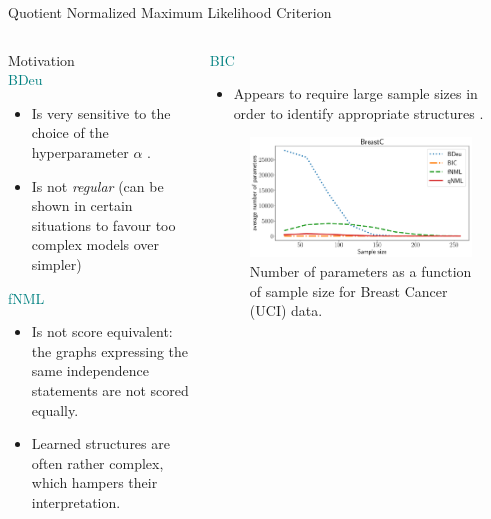 \documentclass[final]{beamer}
\newcommand{\heading}[1]{\alert{\large #1}\\}
\theoremstyle{plain}
\begin{document}
\begin{frame}{}
\begin{block}{Quotient Normalized Maximum Likelihood Criterion}
\begin{columns}[T]
   \begin{column}{0.18\textwidth} %
   \heading{Motivation}
   \vspace*{12pt}
   	\textcolor{teal}{BDeu}
	\begin{itemize}	    
    \item Is very sensitive to the choice of the hyperparameter $\alpha$ \cite{cosco.uai07}.
    \item Is not \textit{regular} \cite{Suzuki2017} (can be shown in certain situations to favour too complex models over simpler) 
    \end{itemize}
    \vspace*{12pt}
    \textcolor{teal}{fNML}
	\begin{itemize}	    
    \item Is not score equivalent: the graphs expressing the same independence statements are not scored equally.
    \item Learned structures are often rather complex, which hampers their interpretation.
    \end{itemize}
    
    
    \end{column}

   \begin{column}{0.18\textwidth}
   \vphantom{\large Motivation}
   \vspace*{12pt} 
    \textcolor{teal}{BIC}
    \begin{itemize}
    \item Appears to
require large sample sizes in order to identify appropriate
structures \cite{cosco.pgm08a,Liu2012}. 
	\end{itemize}  
	
	
	\begin{figure}
  	\includegraphics[width=\textwidth]{breast_cancer_npmean.pdf}
  	\caption{Number of parameters as a function of sample size for Breast Cancer (UCI) data.}
  	\end{figure}


\end{column}
\end{columns}
\end{block}
\end{frame}
\end{document}
